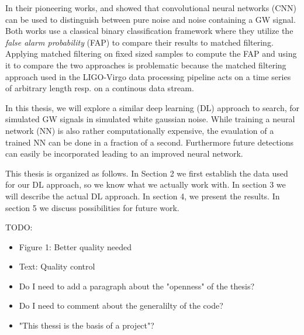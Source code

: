 In their pioneering works, \citeauthor{PhysRevD.97.044039} \cite{PhysRevD.97.044039}
and \citeauthor{PhysRevLett.120.141103} \cite{PhysRevLett.120.141103} showed
that convolutional neural networks (CNN) can be used to distinguish between
pure noise and noise containing a GW signal. Both works use a classical binary
classification framework where they utilize the \textit{false alarm probability}
(FAP) to compare their results to matched filtering. Applying matched filtering
on fixed sized samples to compute the FAP and using it to compare the two
approaches is problematic because the matched filtering approach used in the 
LIGO-Virgo data processing pipeline acts on a time series of arbitrary length
resp. on a continous data stream. \cite{PhysRevD.100.063015}

In this thesis, we will explore a similar deep learning (DL) approach to search,
for simulated GW signals in simulated white gaussian noise. While training a 
neural network (NN) is also rather computationally expensive, the evaulation of
a trained NN can be done in a fraction of a second. Furthermore future 
detections can easily be incorporated leading to an improved neural network.

This thesis is organized as follows. In Section 2 we first establish the data
used for our DL approach, so we know what we actually work with. In section 3 
we will describe the actual DL approach. In section 4, we present the results.
In section 5 we discuss possibilities for future work.

TODO: 
\begin{itemize}
  \item Figure 1: Better quality needed
  \item Text: Quality control
  \item Do I need to add a paragraph about the "openness" of the thesis?
  \item Do I need to comment about the generalilty of the code?
  \item "This thessi is the basis of a project"?
\end{itemize}




